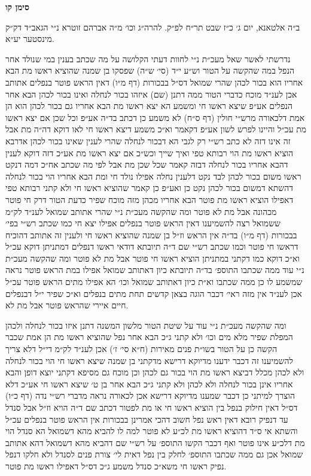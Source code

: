 \documentclass[12pt, openany]{book}
\newcommand{\chapname}{}
\newcommand{\newchap}[1]{
	\addcontentsline{toc}{chapter}{#1}
	\renewcommand{\chapname}{#1}
		\begin{center}
			\textbf{%
\fontsize{16pt}{16pt}\selectfont
				#1}
		\end{center}
}
\begin{document}
\newchap{סימן קו}
\begin{multicols}{2}
ב״ה אלטאנא, יום ג׳ כ״ז שבט תר״ח לפ״ק. להרה״ג וכו׳ מ״ה אברהם זוטרא נ״י הגאב״ד דק״ק מינסטער יע״א.\\\vspace{0pt}

נדרשתי לאשר שאל מעכ״ת נ״י לחוות דעתי הקלושה על מה שכתב בענין במי שנולד אחר הנפל במה שהקשה על הטור וש״ע י״ד (סי׳ ש״ה) שפסקו בן שמנה שהוציא ראשו מת הבא אחריו הוא בכור לכהן שהרי שמואל דס״ל בבכורות (דף מ״ו) דאין הראש פוטר בנפלים אתותב אכן לענ״ד מוכח כדברי הטור ממה דתנן (שם) איזהו בכור לנחלה ואינו בכור לכהן הבא אחר הנפלים אע״פ שיצא ראשו חי ומשמע הא יצא ראשו מת הבא אחריו גם בכור לכהן הוא הן אמת דלכאורה מרש״י חולין (דף ס״ח) לא משמע כן דכתב בד״ה אע״פ וכל שכן אם יצא ראשו מת עכ״ל והיינו לפרש לשון אע״פ דקאמר וא״כ משמע דיצא ראשו חי לאו דוקא דה״ה מת אבל זה אינו דזה לא כתב רש״י רק לגבי הא דבכור לנחלה שהרי לענין שאינו בכור לכהן אדרבא הוציא ראשו מת הוי רבותא טפי ואיך שייך וכש״כ אם יצא ראשו מת אע״כ דזה דוקא לענין דהבא אחריו בכור לנחלה דבזה קאמר שכל שכן מת אבל לפי מה שכתב אח״כ דמה דנקט ראשו משום בכור לכהן לבד נקט דלענין נחלה אפילו נולד חי ומת הבא אחריו הוי בכור לנחלה דהשתא דמשום בכור לכהן נקט כן ואע״פ כן קאמר שהוציא ראשו חי ולא קתני רבותא טפי דאפילו הוציא ראשו מת פוטר הבא אחריו מכהן מזה מוכח שפיר כדעת הטור דרק חי פוטר מכהונה אבל מת לא פוטר ומה שהקשה מעכ״ת נ״י שהרי אתותב שמואל לענ״ד לק״מ ששמואל רצה להשמיענו דאין הראש פוטר בנפלים אפילו יצא חי כמו שכתב רש״י בפי׳ בבכורות (דף מ״ו) בד״ה אין הראש וז״ל בן שמנה שהוציא ראשו חי ולענין זה אתותב דהוכיח דראשו חי פוטר וכמו שכתב רש״י שם ד״ה תיובתא דודאי ראשו דנפלים דמתניתן דוקא עכ״ל וא״כ דוקא כמו דקתני במתניתן הוציא ראשו חי פוטר אבל מת לא פוטר ומה שהקשה מעכ״ת נ״י עוד ממה שכתבו התוספ׳ בד״ה תיובתא כיון דאתותב שמואל אפילו במת הראש פוטר נראה שמשמע לו כן ממה שכתבו וא״ת כיון דאתותב שמואל וכו׳ הא אפילו מתים הראש פוטר עכ״ל אכן לענ״ד אין מזה ראי׳ דכבר הוגה בצאן קדשים תחת מתים בנפלים וא״כ שפיר י״ל דבנפלים חיים איירי שהראש פוטר אבל מת לא.\\\vspace{0pt}

ומה שהקשה מעכ״ת נ״י עוד על שיטת הטור מלשון המשנה דתנן איזו בכור לנחלה ולכהן המפלת שפיר מלא מים וכו׳ ולא קתני ג״כ הבא אחר נפל שהוציא ראשו מת הן אמת שכבר הקשה כן על הטור בשו״ת פנים מאירות (ח״א סי׳ ז׳) אכן לענ״ד לק״מ די״ל דלא צריך להשמיענו זה דכבר ידענו מדיוקא דרישא מדקתני בן שמנה שיצא ראשו חי הוי בכור לנחלה ולא לכהן מכלל דביצא ראשו מת הוי בכור גם לכהן וכן מוכח גם מסיפא דקתני יוצא דופן והבא אחריו אינן בכור לנחלה ולא לכהן ולא קתני ג״כ הבא אחר בן ט׳ שיצא ראשו חי אע״כ דלא הוצרך למיתני כן דכבר שמענו מדיוקא דרישא אכן לכאורה נראה מדברי רש״י נדה (דף כ״ו) דס״ל דאין חילוק בנפל בין הוציא ראשו חי או מת לפטור דכתב שם ד״ה הויא וז״ל אבל סנדל עד דנפיק רובא דאין ראש נפל חשוב דהכי אמרינן בבכורות אין הראש פוטר בנפלים עכ״ל והשתא אי ס״ד דהוציא ראשו מת לכ״ע לא פוטר למה לו להביא מהא דשמואל הא סנדל הוי מת דלכ״ע אינו פוטר ואף דכבר הקשו התוספ׳ על רש״י שם דהביא מהא דשמואל דהא אתותב שמואל אכן גם ממה שכתבו התוספ׳ לחלק בין נפל דאית לי׳ צורת פנים לסנדל ולא חלקו דנפל נפיק ראשו חי משא״כ סנדל משמע ג״כ דס״ל דאפילו ראשו מת פוטר.\\\vspace{0pt}


\end{multicols}
\end{document}
